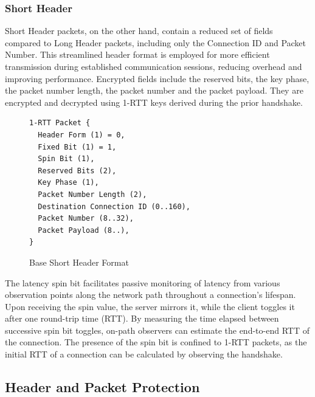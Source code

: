 \subsubsection{Short Header}

Short Header packets, on the other hand, contain a reduced set of fields compared to Long Header packets, including only the Connection ID and Packet Number. This streamlined header format is employed for more efficient transmission during established communication sessions, reducing overhead and improving performance. Encrypted fields include the reserved bits, the key phase, the packet number length, the packet number and the packet payload. They are encrypted and decrypted using 1-RTT keys derived during the prior handshake.

\begin{figure}[htb]
    \centering      
\begin{verbatim}
1-RTT Packet {
  Header Form (1) = 0,
  Fixed Bit (1) = 1,
  Spin Bit (1),
  Reserved Bits (2),
  Key Phase (1),
  Packet Number Length (2),
  Destination Connection ID (0..160),
  Packet Number (8..32),
  Packet Payload (8..),
}
\end{verbatim}
    \caption{Base Short Header Format\cite[98]{rfc9000}}
\end{figure}

The latency spin bit facilitates passive monitoring of latency from various observation points along the network path throughout a connection's lifespan. Upon receiving the spin value, the server mirrors it, while the client toggles it after one round-trip time (RTT). By measuring the time elapsed between successive spin bit toggles, on-path observers can estimate the end-to-end RTT of the connection. The presence of the spin bit is confined to 1-RTT packets, as the initial RTT of a connection can be calculated by observing the handshake.

\subsection{Header and Packet Protection} \label{packet_protection}

